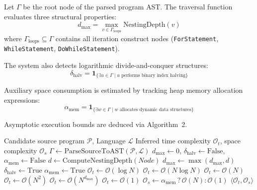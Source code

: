 \documentclass[conference]{IEEEtran}
\begin{document}
Let $\Gamma$ be the root node of the parsed program AST. The traversal function evaluates three structural properties:
\begin{equation}
    d_{\max} = \max_{v \in \Gamma_{\mathrm{loops}}} \mathrm{NestingDepth}(v)
\end{equation}
where $\Gamma_{\mathrm{loops}} \subseteq \Gamma$ contains all iteration construct nodes (\texttt{ForStatement}, \texttt{WhileStatement}, \texttt{DoWhileStatement}).

The system also detects logarithmic divide-and-conquer structures:
\begin{equation}
    \delta_{\mathrm{halv}} = \mathbf{1}_{\{ \exists u \in \Gamma \mid u \text{ performs binary index halving} \}}
\end{equation}

Auxiliary space consumption is estimated by tracking heap memory allocation expressions:
\begin{equation}
    \alpha_{\mathrm{mem}} = \mathbf{1}_{\{ \exists w \in \Gamma \mid w \text{ allocates dynamic data structures} \}}
\end{equation}

Asymptotic execution bounds are deduced via Algorithm~2.

\begin{algorithm}[t]
\caption{Static AST Big-O Complexity Deduction}
\label{alg:bigo}
\begin{algorithmic}[1]
\REQUIRE Candidate source program $\mathcal{P}$, Language $\mathcal{L}$
\ENSURE Inferred time complexity $\mathcal{O}_t$, space complexity $\mathcal{O}_s$
\STATE $\Gamma \leftarrow \mathrm{ParseSourceToAST}(\mathcal{P}, \mathcal{L})$
\STATE $d_{\max} \leftarrow 0$, $\delta_{\mathrm{halv}} \leftarrow \mathrm{False}$, $\alpha_{\mathrm{mem}} \leftarrow \mathrm{False}$
        \STATE $d \leftarrow \mathrm{ComputeNestingDepth}(Node)$
        \STATE $d_{\max} \leftarrow \max(d_{\max}, d)$
    \ENDIF
        \STATE $\delta_{\mathrm{halv}} \leftarrow \mathrm{True}$
    \ENDIF
        \STATE $\alpha_{\mathrm{mem}} \leftarrow \mathrm{True}$
    \ENDIF
\ENDFOR
{}
    \STATE $\mathcal{O}_t \leftarrow \mathcal{O}(\log N)$
    \STATE $\mathcal{O}_t \leftarrow \mathcal{O}(N \log N)$
    \STATE $\mathcal{O}_t \leftarrow \mathcal{O}(N)$
    \STATE $\mathcal{O}_t \leftarrow \mathcal{O}(N^2)$
    \STATE $\mathcal{O}_t \leftarrow \mathcal{O}(N^{d_{\max}})$
\ELSE
    \STATE $\mathcal{O}_t \leftarrow \mathcal{O}(1)$
\ENDIF
\STATE $\mathcal{O}_s \leftarrow \alpha_{\mathrm{mem}} \mathrel{?} \mathcal{O}(N) : \mathcal{O}(1)$
\RETURN $\langle \mathcal{O}_t, \mathcal{O}_s \rangle$
\end{algorithmic}
\end{algorithm}
\end{document}
